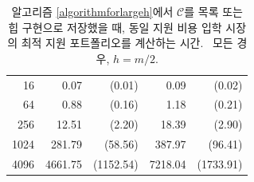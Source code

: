 \documentclass[11pt]{article} %
\newif\ifen
\theoremstyle{definition}
\theoremstyle{definition}
\begin{document}
\begin{table}[h!]
\begin{tabular}{r|r@{~}r|r@{~}r}
    16 &    0.07 &    (0.01) &     0.09 &    (0.02) \\
    64 &    0.88 &    (0.16) &     1.18 &    (0.21) \\
   256 &   12.51 &    (2.20) &    18.39 &    (2.90) \\
  1024 &  281.79 &   (58.56) &   387.97 &   (96.41) \\
  4096 & 4661.75 & (1152.54) &  7218.04 & (1733.91)                                  
\end{tabular}
\caption{\label{experiment1results}
\ifen Time to compute an optimal portfolio for an admissions market with homogeneous application costs using Algorithm \ref{algorithmforlargeh} when $\mathcal{C}$ is stored as a list and as a heap. \lastptofcaption~In every case, $h = m/2$. 
\else 알고리즘 \ref{algorithmforlargeh}에서 $\mathcal{C}$를 목록 또는 힙 구현으로 저장했을 때, 
동일 지원 비용 입학 시장의 최적 지원 포트폴리오를 계산하는 시간. \lastptofcaption~모든 경우, $h = m/2$. \fi}
\end{table}
\end{document}
